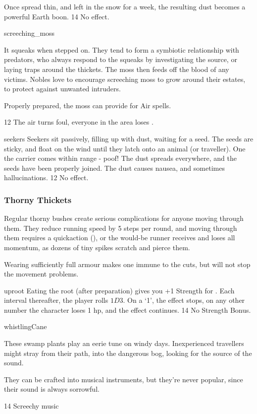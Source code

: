 \begin{multicols}{2}
{  Once spread thin, and left in the snow for a week, the resulting dust becomes a powerful Earth \gls{boon}.
    }
{}%
{14}%
{No effect.}%

%
  {screeching_moss}%
  {
  It squeaks when stepped on.
  They tend to form a symbiotic relationship with predators, who always respond to the squeaks by investigating the source, or laying traps around the thickets.
  The moss then feeds off the blood of any victims.
  Nobles love to encourage screeching moss to grow around their estates, to protect against unwanted intruders.

  Properly prepared, the moss can provide  for Air spells.
    }
  {}%
  {12}%
  {The air turns foul, everyone in the \gls{area} loses .}%


%
  {seekers}%
  {
  Seekers sit passively, filling up with dust, waiting for a seed.
  The seeds are sticky, and float on the wind until they latch onto an animal (or traveller).
  One the carrier comes within range - poof!
  The dust spreads everywhere, and the seeds have been properly joined.
  The dust causes nausea, and sometimes hallucinations.
    }
{}%
{12}%
{No effect.}%

\subsubsection{Thorny Thickets}
\label{thorny_thickets}

Regular thorny bushes create serious complications for anyone moving through them.
They reduce running speed by 5 \glspl{step} per round, and moving through them requires a  \gls{quickaction} (\tn[10]), or the would-be runner receives  and loses all momentum, as dozens of tiny spikes scratch and pierce them.

Wearing sufficiently full armour makes one immune to the cuts, but will not stop the movement problems.

%
  {uproot}%
  {
  Eating the root (after preparation) gives you +1 Strength for .
  Each \gls{interval} thereafter, the player rolls $1D3$.
  On a `1', the effect stops, on any other number the character loses 1 \gls{hp}, and the effect continues.
    }
{}%
{14}%
{No Strength Bonus.}%

%
  {whistlingCane}%
  {
  These swamp plants play an eerie tune on windy days.
  Inexperienced travellers might stray from their path, into the dangerous bog, looking for the source of the sound.

  They can be crafted into musical instruments, but they're never popular, since their sound is always sorrowful.
  }
{}%
{14}%
{Screechy music}%

\end{multicols}

